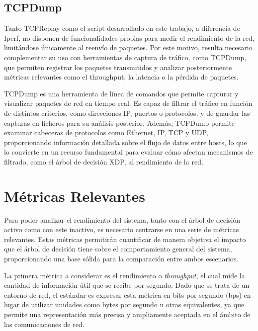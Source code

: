 
\subsection{TCPDump}
Tanto TCPReplay como el script desarrollado en este trabajo, a diferencia de Iperf, no disponen de funcionalidades propias para medir el rendimiento de la red, limitándose únicamente al reenvío de paquetes. Por este motivo, resulta necesario complementar su uso con herramientas de captura de tráfico, como TCPDump, que permiten registrar los paquetes transmitidos y analizar posteriormente métricas relevantes como el throughput, la latencia o la pérdida de paquetes\cite{tcpdump-manpage}.

TCPDump es una herramienta de línea de comandos que permite capturar y visualizar paquetes de red en tiempo real. Es capaz de filtrar el tráfico en función de distintos criterios, como direcciones IP, puertos o protocolos, y de guardar las capturas en ficheros para su análisis posterior. Además, TCPDump permite examinar cabeceras de protocolos como Ethernet, IP, TCP y UDP, proporcionando información detallada sobre el flujo de datos entre hosts, lo que lo convierte en un recurso fundamental para evaluar cómo afectan mecanismos de filtrado, como el árbol de decisión XDP, al rendimiento de la red.

\section{Métricas Relevantes}

Para poder analizar el rendimiento del sistema, tanto con el árbol de decisión activo como con este inactivo, es necesario centrarse en una serie de métricas relevantes. Estas métricas permitirán cuantificar de manera objetiva el impacto que el árbol de decisión tiene sobre el comportamiento general del sistema, proporcionando una base sólida para la comparación entre ambos escenarios.

La primera métrica a considerar es el rendimiento o \textit{throughput}, el cual mide la cantidad de información útil que se recibe por segundo. Dado que se trata de un entorno de red, el estándar es expresar esta métrica en bits por segundo (bps) en lugar de utilizar unidades como bytes por segundo u otras equivalentes, ya que permite una representación más precisa y ampliamente aceptada en el ámbito de las comunicaciones de red.

